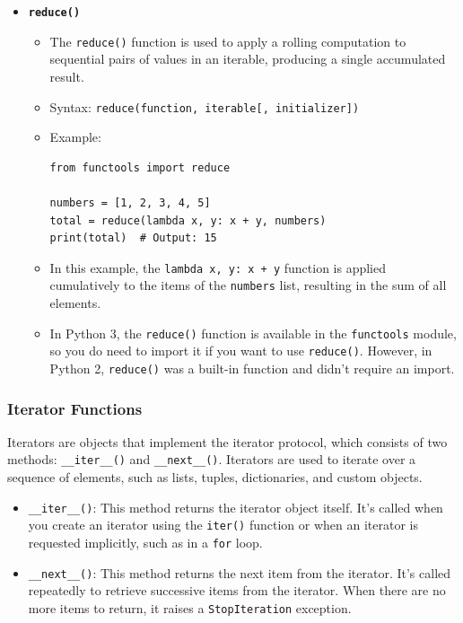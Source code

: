 \begin{itemize}
    \item \textbf{\texttt{reduce()}}
    \begin{itemize}
        \item The \texttt{reduce()} function is used to apply a rolling computation to sequential pairs of values in an iterable, producing a single accumulated result.
        \item Syntax: \texttt{reduce(function, iterable[, initializer])}
        \item Example:
\begin{codebox}
\begin{verbatim}
from functools import reduce

numbers = [1, 2, 3, 4, 5]
total = reduce(lambda x, y: x + y, numbers)
print(total)  # Output: 15
\end{verbatim}
\end{codebox}
        \item In this example, the \texttt{lambda x, y: x + y} function is applied cumulatively to the items of the \texttt{numbers} list, resulting in the sum of all elements.
        \item In Python 3, the \texttt{reduce()} function is available in the \texttt{functools} module, so you do need to import it if you want to use \texttt{reduce()}. However, in Python 2, \texttt{reduce()} was a built-in function and didn't require an import.

    \end{itemize}
\end{itemize}

\newpage
\subsubsection{Iterator Functions}
Iterators are objects that implement the iterator protocol, which consists of two methods: \texttt{\_\_iter\_\_()} and \texttt{\_\_next\_\_()}. Iterators are used to iterate over a sequence of elements, such as lists, tuples, dictionaries, and custom objects.

\begin{itemize}
    \item \texttt{\_\_iter\_\_()}: This method returns the iterator object itself. It's called when you create an iterator using the \texttt{iter()} function or when an iterator is requested implicitly, such as in a \texttt{for} loop.
    
    \item \texttt{\_\_next\_\_()}: This method returns the next item from the iterator. It's called repeatedly to retrieve successive items from the iterator. When there are no more items to return, it raises a \texttt{StopIteration} exception.
\end{itemize}

